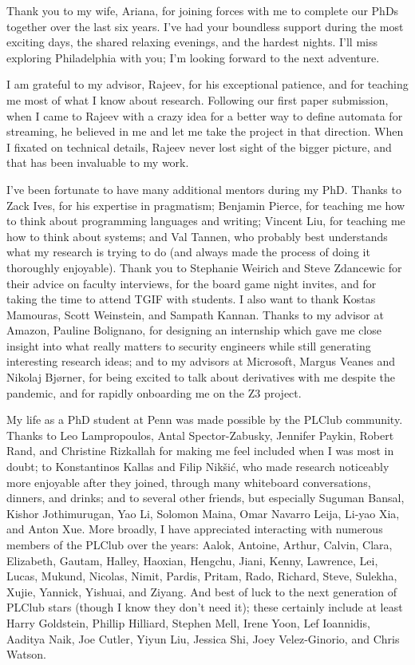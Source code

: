 Thank you to my wife, Ariana, for joining forces with me to complete our PhDs together over the last six years.
I've had your boundless support during the most exciting days, the shared relaxing evenings, and the hardest nights.
I'll miss exploring Philadelphia with you; I'm looking forward to the next adventure.

I am grateful to my advisor, Rajeev, for his exceptional patience, and for teaching me most of what I know about research.
Following our first paper submission, when I came to Rajeev with a crazy idea for a better way to define automata for streaming, he believed in me and let me take the project in that direction.
When I fixated on technical details, Rajeev never lost sight of the bigger picture, and that has been invaluable to my work.

I've been fortunate to have many additional mentors during my PhD. Thanks to Zack Ives, for his expertise in pragmatism; Benjamin Pierce, for teaching me how to think about programming languages and writing; Vincent Liu, for teaching me how to think about systems; and Val Tannen, who probably best understands what my research is trying to do (and always made the process of doing it thoroughly enjoyable).
Thank you to Stephanie Weirich and Steve Zdancewic for their advice on faculty interviews, for the board game night invites, and for taking the time to attend TGIF with students.
I also want to thank Kostas Mamouras, Scott Weinstein, and Sampath Kannan.
Thanks to my advisor at Amazon, Pauline Bolignano, for designing an internship which gave me close insight into what really matters to security engineers while still generating interesting research ideas; and to my advisors at Microsoft, Margus Veanes and Nikolaj Bjørner,
for being excited to talk about derivatives with me despite the pandemic, and for rapidly onboarding me on the Z3 project.

My life as a PhD student at Penn was made possible by the PLClub community.
Thanks to Leo Lampropoulos, Antal Spector-Zabusky, Jennifer Paykin, Robert Rand, and Christine Rizkallah for making me feel included when I was most in doubt;
to Konstantinos Kallas and Filip Nikšić, who made research noticeably more enjoyable after they joined, through many whiteboard conversations, dinners, and drinks;
and to several other friends, but especially Suguman Bansal, Kishor Jothimurugan, Yao Li, Solomon Maina, Omar Navarro Leija, Li-yao Xia, and Anton Xue.
More broadly, I have appreciated interacting with numerous members of the PLClub over the years:
Aalok, Antoine, Arthur, Calvin, Clara,
Elizabeth, Gautam, Halley, Haoxian, Hengchu,
Jiani, Kenny, Lawrence, Lei, Lucas,
Mukund, Nicolas, Nimit, Pardis, Pritam,
Rado, Richard, Steve, Sulekha, Xujie,
Yannick, Yishuai, and Ziyang.
And best of luck to the next generation of PLClub stars
(though I know they don't need it);
these certainly include at least
Harry Goldstein, Phillip Hilliard, Stephen Mell, Irene Yoon,
Lef Ioannidis, Aaditya Naik,
Joe Cutler, Yiyun Liu, Jessica Shi, Joey Velez-Ginorio, and Chris Watson.

